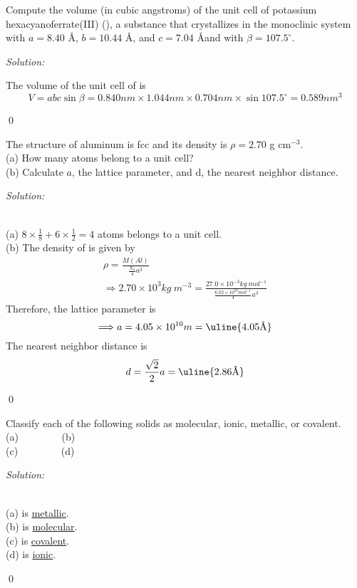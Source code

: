 \documentclass[12pt]{article}
\newenvironment{problem}[2][Problem]{\begin{trivlist}
\item[\hskip \labelsep {\bfseries #1}\hskip \labelsep {\bfseries #2.}]}{\end{trivlist}}
\newenvironment{sol}
    {\emph{Solution:}
    }
    {
    \qed
    }
\begin{document}
\begin{problem}{21.12}
Compute the volume (in cubic angstroms) of the unit cell of potassium hexacyanoferrate(III) (), a substance that crystallizes in the monoclinic system with $a=8.40$ \AA, $b=10.44$ \AA, and $c=7.04$ \AA and with $\beta=107.5^{\circ}$.
\end{problem}
\begin{sol}
The volume of the unit cell of  is
\[
V=abc\sin\beta=0.840nm\times1.044nm\times0.704nm\times\sin107.5^{\circ}=0.589nm^3
\]
\end{sol}

\begin{problem}{21.22}
The structure of aluminum is fcc and its density is $\rho=2.70$ g cm$^{-3}$.\\
(a) How many  atoms belong to a unit cell?\\
(b) Calculate $a$, the lattice parameter, and d, the nearest neighbor distance.
\end{problem}
\begin{sol}
\\(a) $8\times\frac{1}{8}+6\times\frac{1}{2}=4$  atoms belongs to a unit cell.\\
(b) The density of  is given by
\begin{gather*}
\rho=\frac{M(Al)}{\frac{N_a}{4}a^3}\\
\Longrightarrow2.70\times10^3kg~m^{-3}=\frac{27.0\times10^{-3}kg~mol^{-1}}{\frac{6.02\times10^{23}mol^{-1}}{4}a^3}
\end{gather*}
Therefore, the lattice parameter is
\[
\Longrightarrow a=4.05\times10^{10}m=\uline{4.05\text{\AA}}
\]
The nearest neighbor distance is
\[
d=\frac{\sqrt{2}}{2}a=\uline{2.86\text{\AA}}
\]
\end{sol}

\begin{problem}{21.28}
Classify each of the following solids as molecular, ionic, metallic, or covalent.\\
(a) ~~~~~~~~(b) \\
(c)  ~~~~~~~~(d) 
\end{problem}
\begin{sol}
\\(a)  is \uline{metallic}.\\
(b)  is \uline{molecular}.\\
(c)  is \uline{covalent}.\\
(d)  is \uline{ionic}.
\end{sol}
\end{document}

